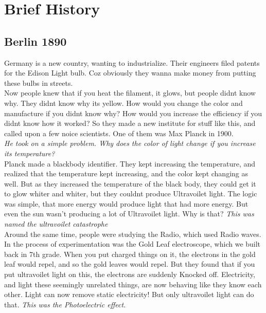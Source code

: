 \documentclass[11pt]{article}
\begin{document}
\clearpage
\tableofcontents
\clearpage

\section{Brief History}

\subsection{Berlin 1890}
Germany is a new country, wanting to industrialize. Their engineers filed patents for the Edison Light bulb. Coz obviously they wanna make money from putting these bulbs in streets. \\

Now people knew that if you heat the filament, it glows, but people didnt know why. They didnt know why its yellow. How would you change the color and manufacture if you didnt know why? How would you increase the efficiency if you didnt know how it worked? So they made a new institute for stuff like this, and called upon a few noice scientists. One of them was Max Planck in 1900. \\

\textit{He took on a simple problem. Why does the color of light change if you increase its temperature? }\\

Planck made a blackbody identifier. They kept increasing the temperature, and realized that the temperature kept increasing, and the color kept changing as well.  But as they increased the temperature of the black body, they could get it to glow whiter and whiter, but they couldnt produce Ultravoilet light. The logic was simple, that more energy would produce light that had more energy. But even the sun wasn't producing a lot of Ultravoilet light. Why is that? \textit{This was named the ultravoilet catastrophe}\\

Around the same time, people were studying the Radio, which used Radio waves. In the process of experimentation was the Gold Leaf electroscope, which we built back in 7th grade. When you put charged things on it, the electrons in the gold leaf would repel, and so the gold leaves would repel. But they found that if you put ultravoilet light on this, the electrons are suddenly Knocked off. Electricity, and light these seemingly unrelated things, are now behaving like they know each other. Light can now remove static electricity! But only ultravoilet light can do that. \textit{This was the Photoelectric effect. }\\
\end{document}
